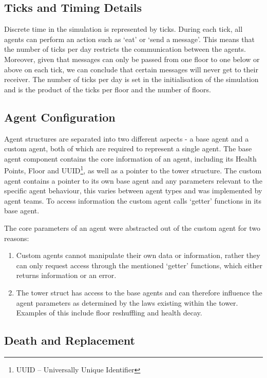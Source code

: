 \subsection{Ticks and Timing Details}

Discrete time in the simulation is represented by ticks. During each tick, all agents can perform an action such as `eat' or `send a message'. This means that the number of ticks per day restricts the communication between the agents. Moreover, given that messages can only be passed from one floor to one below or above on each tick, we can conclude that certain messages will never get to their receiver. The number of ticks per day is set in the initialisation of the simulation and is the product of the ticks per floor and the number of floors.

\subsection{Agent Configuration}

Agent structures are separated into two different aspects - a base agent and a custom agent, both of which are required to represent a single agent.
The base agent component contains the core information of an agent, including its Health Points, Floor and UUID\footnote{UUID -- Universally Unique Identifier}, as well as a pointer to the tower structure. 
The custom agent contains a pointer to its own base agent and any parameters relevant to the specific agent behaviour, this varies between agent types and was implemented by agent teams. To access information the custom agent calls `getter' functions in its base agent.

The core parameters of an agent were abstracted out of the custom agent for two reasons:
\begin{enumerate}
    \item Custom agents cannot manipulate their own data or information, rather they can only request access through the mentioned `getter' functions, which either returns information or an error.
    \item The tower struct has access to the base agents and can therefore influence the agent parameters as determined by the laws existing within the tower. Examples of this include floor reshuffling and health decay.
\end{enumerate}

\subsection{Death and Replacement}


